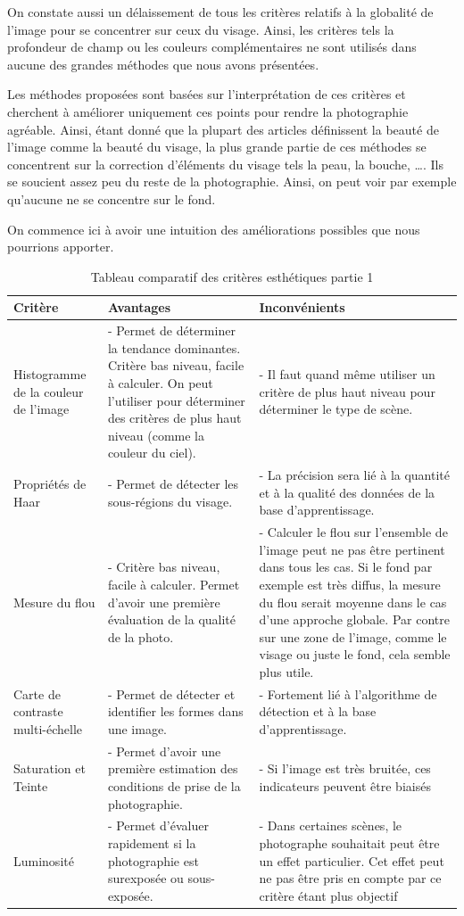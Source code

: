 \documentclass[11pt, french,screen]{report-rd-info}
\begin{document}
On constate aussi un délaissement de tous les critères relatifs à la globalité de l’image pour se concentrer sur ceux du visage. Ainsi, les critères tels la profondeur de champ ou les couleurs complémentaires ne sont utilisés dans aucune des grandes méthodes que nous avons présentées.

Les méthodes proposées sont basées sur l’interprétation de ces critères et cherchent à améliorer uniquement ces points pour rendre la photographie agréable. Ainsi, étant donné que la plupart des articles définissent la beauté de l’image comme la beauté du visage, la plus grande partie de ces méthodes se concentrent sur la correction d’éléments du visage tels la peau, la bouche, \ldots. Ils se soucient assez peu du reste de la photographie. Ainsi, on peut voir par exemple qu’aucune ne se concentre sur le fond.

On commence ici à avoir une intuition des améliorations possibles que nous pourrions apporter.
\begin{table}
\begin{center}
\begin{tabular}{|p{3cm}|p{6cm}|p{7cm}|}
\hline
\textbf{Critère} & \textbf{Avantages} & \textbf{Inconvénients} \\ \hline
Histogramme de la couleur de l'image & - Permet de déterminer la tendance dominantes. Critère bas niveau, facile à calculer. On peut l'utiliser pour déterminer des critères de plus haut niveau (comme la couleur du ciel). & - Il faut quand même utiliser un critère de plus haut niveau pour déterminer le type de scène. \\ \hline
Propriétés de Haar & - Permet de détecter les sous-régions du visage. & - La précision sera lié à la quantité et à la qualité des données de la base d'apprentissage. \\ \hline
Mesure du flou & - Critère bas niveau, facile à calculer. Permet d'avoir une première évaluation de la qualité de la photo. & - Calculer le flou sur l'ensemble de l'image peut ne pas être pertinent dans tous les cas. Si le fond par exemple est très diffus, la mesure du flou serait moyenne dans le cas d'une approche globale. Par contre sur une zone de l'image, comme le visage ou juste le fond, cela semble plus utile. \\ \hline
Carte de contraste multi-échelle & - Permet de détecter et identifier les formes dans une image. & - Fortement lié à l’algorithme de détection et à la base d'apprentissage. \\ \hline
Saturation et Teinte & - Permet d'avoir une première estimation des conditions de prise de la photographie. & - Si l'image est très bruitée, ces indicateurs peuvent être biaisés \\ \hline
Luminosité & - Permet d'évaluer rapidement si la photographie est surexposée ou sous-exposée. & - Dans certaines scènes, le photographe souhaitait peut être un effet particulier. Cet effet peut ne pas être pris en compte par ce critère étant plus objectif\\ \hline
\end{tabular}
\end{center}
\caption{Tableau comparatif des critères esthétiques partie 1}
\label{tab:ComparaisonCriteres1}
\end{table}
\end{document}
